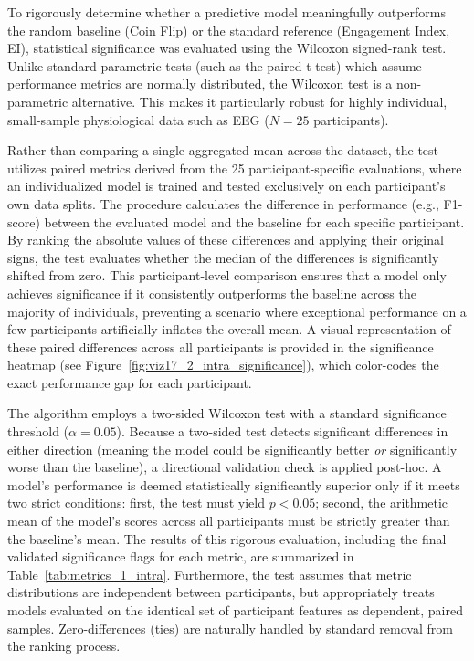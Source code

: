 To rigorously determine whether a predictive model meaningfully outperforms the random baseline (Coin Flip) or the standard reference (Engagement Index, EI), statistical significance was evaluated using the Wilcoxon signed-rank test. Unlike standard parametric tests (such as the paired t-test) which assume performance metrics are normally distributed, the Wilcoxon test is a non-parametric alternative. This makes it particularly robust for highly individual, small-sample physiological data such as EEG ($N=25$ participants).

Rather than comparing a single aggregated mean across the dataset, the test utilizes paired metrics derived from the 25 participant-specific evaluations, where an individualized model is trained and tested exclusively on each participant's own data splits. The procedure calculates the difference in performance (e.g., F1-score) between the evaluated model and the baseline for each specific participant. By ranking the absolute values of these differences and applying their original signs, the test evaluates whether the median of the differences is significantly shifted from zero. This participant-level comparison ensures that a model only achieves significance if it consistently outperforms the baseline across the majority of individuals, preventing a scenario where exceptional performance on a few participants artificially inflates the overall mean. A visual representation of these paired differences across all participants is provided in the significance heatmap (see Figure~\ref{fig:viz17_2_intra_significance}), which color-codes the exact performance gap for each participant.

The algorithm employs a two-sided Wilcoxon test with a standard significance threshold ($\alpha = 0.05$). Because a two-sided test detects significant differences in either direction (meaning the model could be significantly better \textit{or} significantly worse than the baseline), a directional validation check is applied post-hoc. A model's performance is deemed statistically significantly superior only if it meets two strict conditions: first, the test must yield $p < 0.05$; second, the arithmetic mean of the model's scores across all participants must be strictly greater than the baseline's mean. The results of this rigorous evaluation, including the final validated significance flags for each metric, are summarized in Table~\ref{tab:metrics_1_intra}. Furthermore, the test assumes that metric distributions are independent between participants, but appropriately treats models evaluated on the identical set of participant features as dependent, paired samples. Zero-differences (ties) are naturally handled by standard removal from the ranking process.
